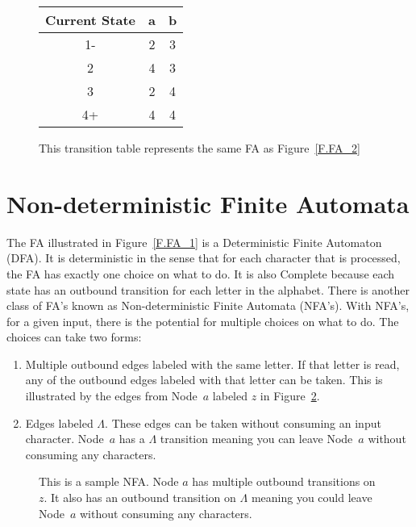 \documentclass[letterpaper,12pt,openany,reqno]{book}%
\newcommand{\faterminalnode}[3] {\node at (#1) (#2) [circle, draw, double, minimum size=24pt] {#2};}
\newcommand{\fastart}[1] {\coordinate (start) at (#1);}
\newcommand{\fanonterminalnode}[2] {\node at (#1) (#2) [circle, draw, minimum size=24pt] {#2};}
\newcommand{\fatransition}[3] {\draw [->] (#1) -- (#2) node [midway, above] {#3};}
\newcommand{\farighttransition}[3] {\draw [->] (#1) -- (#2) node [midway, right] {#3};}
\begin{document}
\begin{figure}[hbt]
\centering
\begin{tabular}{|c|c|c|}
\hline
Current State & a & b \\
\hline
1- & 2 & 3 \\
\hline
2 & 4 & 3 \\
\hline
3 & 2 & 4 \\
\hline
4+ & 4 & 4 \\
\hline
\end{tabular}
\caption[Transition Table]{This transition table represents the same FA as Figure~\ref{F.FA_2}}
\label{T.FA.2}
\end{figure}

\section{Non-deterministic Finite Automata}

The FA illustrated in Figure~\ref{F.FA_1} is a Deterministic Finite Automaton (DFA). It is deterministic in the sense that for each character that is processed, the FA has exactly one choice on what to do. It is also Complete because each state has an outbound transition for each letter in the alphabet. There is another class of FA's known as Non-deterministic Finite Automata (NFA's). With NFA's, for a given input, there is the potential for multiple choices on what to do. The choices can take two forms:
\begin{enumerate}
\item Multiple outbound edges labeled with the same letter. If that letter is read, any of the outbound edges labeled with that letter can be taken. This is illustrated by the edges from Node~$a$ labeled $z$ in Figure~\ref{F.NFA_1}.
\item Edges labeled $\Lambda$. These edges can be taken without consuming an input character. Node~$a$ has a $\Lambda$ transition meaning you can leave Node~$a$ without consuming any characters.
\end{enumerate}

\begin{figure}[hbt]
\centering
{}
 \caption[Sample Non-deterministic Finite Automaton]{This is a sample NFA. Node $a$ has multiple outbound transitions on $z$. It also has an outbound transition on $\Lambda$ meaning you could leave Node~$a$ without consuming any characters.}
  \label{F.NFA_1}
\end{figure}
\end{document}
